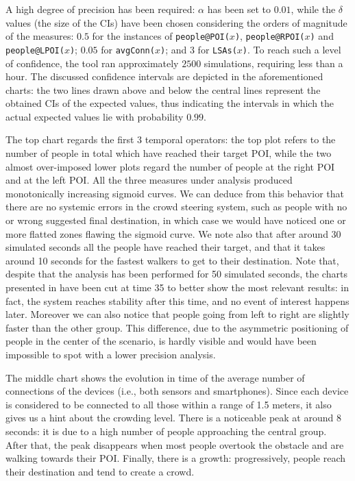 \documentclass[12pt,a4paper,twoside,openright]{book}
\begin{document}
A high degree of precision has been required: $\alpha$ has been set to $0.01$, while the $\delta$ values (the size of the CIs) have been chosen considering the orders of magnitude of the measures: $0.5$ for the instances of \texttt{people@POI($x$)}, \texttt{people@RPOI($x$)} and \texttt{people@LPOI($x$)}; $0.05$ for  \texttt{avgConn($x$)}; and $3$ for \texttt{LSAs($x$)}.
%
To reach such a level of confidence, the tool ran approximately $2500$ simulations, requiring less than a hour.
%
The discussed confidence intervals are depicted in the aforementioned charts: the two lines drawn above and below the central lines represent the obtained CIs of the expected values, thus indicating the intervals in which the actual expected values lie with probability $0.99$.

The top chart regards the first $3$ temporal operators: the top plot refers to the number of people in total which have reached their target POI, while the two almost over-imposed lower plots regard the number of people at the right POI and at the left POI. 
%
All the three measures under analysis produced monotonically increasing sigmoid curves.
%
We can deduce from this behavior that there are no systemic errors in the crowd steering system, such as people with no or wrong suggested final destination, in which case we would have noticed one or more flatted zones flawing the sigmoid curve.
%
We note also that after around 30 simulated seconds all the people have reached their target, and that it takes around 10 seconds for the fastest walkers to get to their destination.
Note that, despite that the analysis has been performed for 50 simulated seconds, the charts presented in  have been cut at time 35 to better show the most relevant results: in fact, the system reaches stability after this time, and no event of interest happens later.
%
Moreover we can also notice that people going from left to right are slightly faster than the other group.
%
This difference, due to the asymmetric positioning of people in the center of the scenario, is hardly visible and would have been impossible to spot with a lower precision analysis.

The middle chart shows the evolution in time of the average number of connections of the devices (i.e., both sensors and smartphones).
%
Since each device is considered to be connected to all those within a range of 1.5 meters, it also gives us a hint about the crowding level.
%
There is a noticeable peak at around 8 seconds: it is due to a high number of people approaching the central group.
%
After that, the peak disappears when most people overtook the obstacle and are walking towards their POI.
%
Finally, there is a growth: progressively, people reach their destination and tend to create a crowd.
\end{document}
